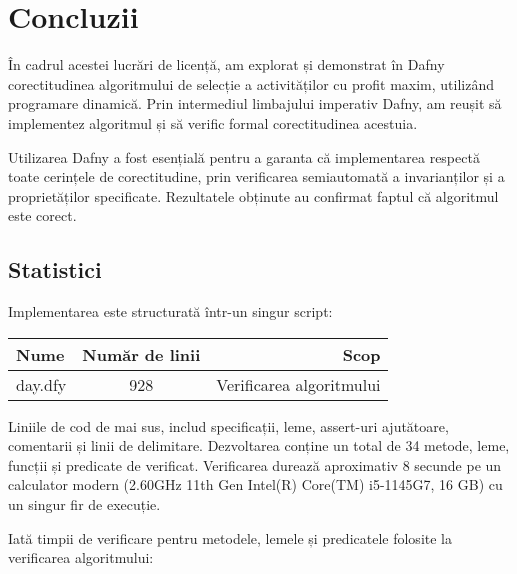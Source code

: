 \chapter*{Concluzii} 
În cadrul acestei lucrări de licență, am explorat și demonstrat în Dafny corectitudinea algoritmului de selecție a activităților cu profit maxim, utilizând programare dinamică. Prin intermediul limbajului imperativ Dafny, am reușit să implementez algoritmul și să verific formal corectitudinea acestuia.
 
Utilizarea Dafny a fost esențială pentru a garanta că implementarea respectă toate cerințele de corectitudine, prin verificarea semiautomată a invarianților și a proprietăților specificate.
Rezultatele obținute au confirmat faptul că algoritmul este corect.

\section{Statistici}
Implementarea este structurată într-un singur script:
\begin{table}[h!]
  \centering
  \begin{tabular}{lcr} %
    \toprule
    Nume & Număr de linii  & Scop \\
    \midrule
    day.dfy  & 928  & Verificarea algoritmului   \\
    \bottomrule
  \end{tabular}
  \label{tab:table1}
\end{table}

Liniile de cod de mai sus, includ specificații, leme, assert-uri ajutătoare, comentarii și linii de delimitare. Dezvoltarea conține un total de 34 metode, leme, funcții și predicate de verificat. Verificarea durează aproximativ 8 secunde pe un calculator modern (2.60GHz 11th Gen Intel(R) Core(TM) i5-1145G7, 16 GB) cu un singur fir de execuție. 

Iată timpii de verificare pentru metodele, lemele și predicatele folosite la verificarea algoritmului:

